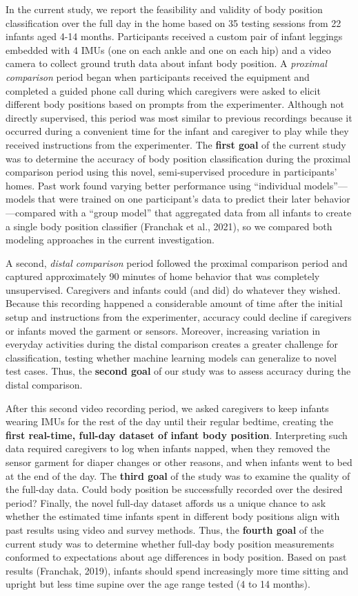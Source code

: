 \documentclass[
  man]{apa6}
\begin{document}
In the current study, we report the feasibility and validity of body position classification over the full day in the home based on 35 testing sessions from 22 infants aged 4-14 months. Participants received a custom pair of infant leggings embedded with 4 IMUs (one on each ankle and one on each hip) and a video camera to collect ground truth data about infant body position. A \emph{proximal comparison} period began when participants received the equipment and completed a guided phone call during which caregivers were asked to elicit different body positions based on prompts from the experimenter. Although not directly supervised, this period was most similar to previous recordings because it occurred during a convenient time for the infant and caregiver to play while they received instructions from the experimenter. The \textbf{first goal} of the current study was to determine the accuracy of body position classification during the proximal comparison period using this novel, semi-supervised procedure in participants' homes. Past work found varying better performance using ``individual models''---models that were trained on one participant's data to predict their later behavior---compared with a ``group model'' that aggregated data from all infants to create a single body position classifier (Franchak et al., 2021), so we compared both modeling approaches in the current investigation.

A second, \emph{distal comparison} period followed the proximal comparison period and captured approximately 90 minutes of home behavior that was completely unsupervised. Caregivers and infants could (and did) do whatever they wished. Because this recording happened a considerable amount of time after the initial setup and instructions from the experimenter, accuracy could decline if caregivers or infants moved the garment or sensors. Moreover, increasing variation in everyday activities during the distal comparison creates a greater challenge for classification, testing whether machine learning models can generalize to novel test cases. Thus, the \textbf{second goal} of our study was to assess accuracy during the distal comparison.

After this second video recording period, we asked caregivers to keep infants wearing IMUs for the rest of the day until their regular bedtime, creating the \textbf{first real-time, full-day dataset of infant body position}. Interpreting such data required caregivers to log when infants napped, when they removed the sensor garment for diaper changes or other reasons, and when infants went to bed at the end of the day. The \textbf{third goal} of the study was to examine the quality of the full-day data. Could body position be successfully recorded over the desired period? Finally, the novel full-day dataset affords us a unique chance to ask whether the estimated time infants spent in different body positions align with past results using video and survey methods. Thus, the \textbf{fourth goal} of the current study was to determine whether full-day body position measurements conformed to expectations about age differences in body position. Based on past results (Franchak, 2019), infants should spend increasingly more time sitting and upright but less time supine over the age range tested (4 to 14 months).
\end{document}
